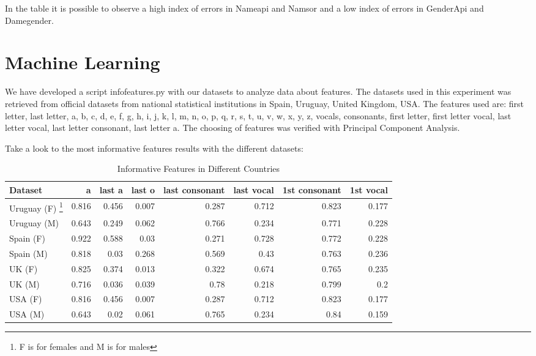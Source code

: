\documentclass[a4paper]{article}
\begin{document}
In the table it is possible to observe a high index of errors in
Nameapi and Namsor and a low index of errors in GenderApi
and Damegender.


\section{Machine Learning}

We have developed a script infofeatures.py with our datasets to
analyze data about features. The datasets used in this experiment was
retrieved from official datasets from national statistical
institutions in Spain, Uruguay, United Kingdom, USA. The features used
are: first letter, last letter, a, b, c, d, e, f, g, h, i, j, k, l, m,
n, o, p, q, r, s, t, u, v, w, x, y, z, vocals, consonants, first
letter, first letter vocal, last letter vocal, last letter consonant,
last letter a. The choosing of features was verified with Principal
Component Analysis.

Take a look to the most informative features results with the
different datasets:

\begin{table*}
\footnotesize
\begin{tabular}[]{lrrrrrrr}
  \hline
Dataset & a & last a & last o & last consonant & last vocal & 1st consonant & 1st vocal  \tabularnewline
  \hline
 Uruguay (F) \footnote{F is for females and M is for males} &    0.816 &         0.456 &         0.007 &                 0.287 &             0.712 &                  0.823 &              0.177  \tabularnewline
 Uruguay (M) \footnotemark[3] &    0.643 &         0.249 &         0.062 &                 0.766 &             0.234 &                  0.771 &              0.228  \tabularnewline
 Spain (F) \footnotemark[3]  &    0.922 &         0.588 &          0.03 &                 0.271 &             0.728 &                  0.772 &              0.228  \tabularnewline
 Spain (M) \footnotemark[3]  &    0.818 &          0.03 &         0.268 &                 0.569 &              0.43 &                  0.763 &              0.236  \tabularnewline
 UK (F) \footnotemark[3]     &    0.825 &         0.374 &         0.013 &                 0.322 &             0.674 &                  0.765 &              0.235  \tabularnewline
 UK (M) \footnotemark[3]     &    0.716 &         0.036 &         0.039 &                  0.78 &             0.218 &                  0.799 &                0.2  \tabularnewline
 USA (F) \footnotemark[3]    &    0.816 &         0.456 &         0.007 &                 0.287 &             0.712 &                  0.823 &              0.177  \tabularnewline
 USA (M) \footnotemark[3]    &    0.643 &          0.02 &         0.061 &                 0.765 &             0.234 &                   0.84 &              0.159  \tabularnewline
\hline
\end{tabular}
\caption{Informative Features in Different Countries}
\label{table:InfoFeatures}
\end{table*}
\end{document}
